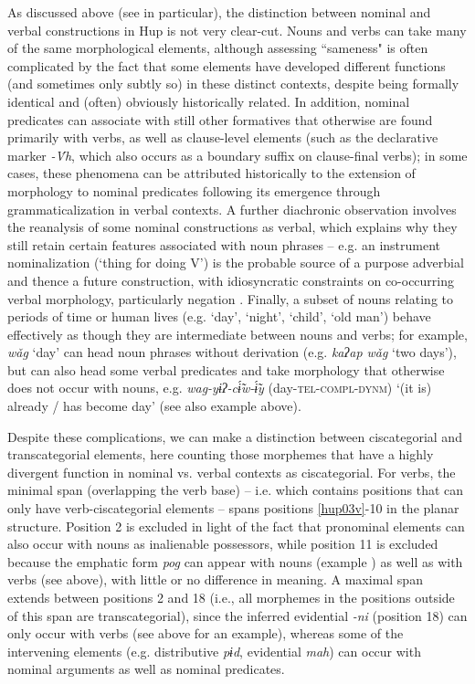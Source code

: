 \documentclass[output=paper]{langscibook}
\begin{document}
As discussed above (see  in particular), the distinction between nominal and verbal constructions in Hup is not very clear-cut. Nouns and verbs can take many of the same morphological elements, although assessing ``sameness" is often complicated by the fact that some elements have developed different functions (and sometimes only subtly so) in these distinct contexts, despite being formally identical and (often) obviously historically related. In addition, nominal predicates can associate with still other formatives that otherwise are found primarily with verbs, as well as clause-level elements (such as the declarative marker \textit{{}-\'{V}h}, which also occurs as a boundary suffix on clause-final verbs); in some cases, these phenomena can be attributed historically to the extension of morphology to nominal predicates following its emergence through grammaticalization in verbal contexts. A further diachronic observation involves the reanalysis of some nominal constructions as verbal, which explains why they still retain certain features associated with noun phrases – e.g. an instrument nominalization (`thing for doing V') is the probable source of a purpose adverbial and thence a future construction, with idiosyncratic constraints on co-occurring verbal morphology, particularly negation \citep{Epps2008b}. Finally, a subset of nouns relating to periods of time or human lives (e.g. `day', `night', `child', `old man') behave effectively as though they are intermediate between nouns and verbs; for example, \textit{wǎg} `day' can head noun phrases without derivation (e.g. \textit{kaʔap wǎg} `two days'), but can also head some verbal predicates and take morphology that otherwise does not occur with nouns, e.g. \textit{wag-yɨʔ-cɨ̃́w-ɨ̃́y} (day-\textsc{tel}{}-\textsc{compl}{}-\textsc{dynm}) `(it is) already / has become day' (see also example  above).

Despite these complications, we can make a distinction between ciscategorial and transcategorial elements, here counting those morphemes that have a highly divergent function in nominal vs. verbal contexts as ciscategorial. For verbs, the minimal span (overlapping the verb base) – i.e. which contains positions that can only have verb-ciscategorial elements – spans positions \ref{hup03v}-10 in the planar structure. Position 2 is excluded in light of the fact that pronominal elements can also occur with nouns as inalienable possessors, while position 11 is excluded because the emphatic form \textit{pog} can appear with nouns (example ) as well as with verbs (see  above), with little or no difference in meaning. A maximal span extends between positions 2 and 18 (i.e., all morphemes in the positions outside of this span are transcategorial), since the inferred evidential \textit{{}-ni} (position 18) can only occur with verbs (see  above for an example), whereas some of the intervening elements (e.g. distributive \textit{pɨd}, evidential \textit{mah}) can occur with nominal arguments as well as nominal predicates.
\end{document}

